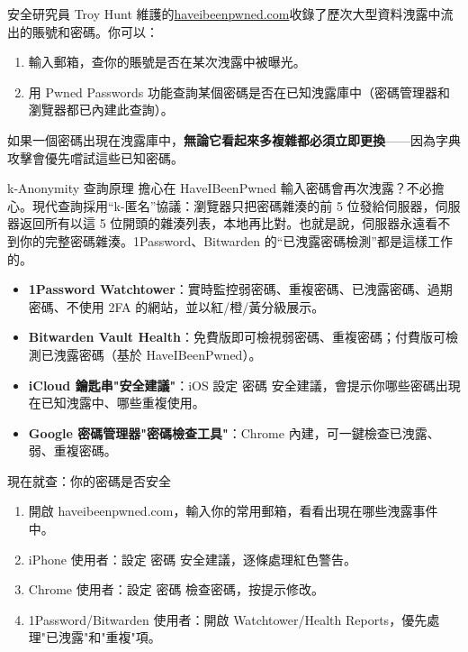安全研究員 Troy Hunt 維護的\href{https://haveibeenpwned.com}{haveibeenpwned.com}收錄了歷次大型資料洩露中流出的賬號和密碼。你可以：

\begin{enumerate}
  \item 輸入郵箱，查你的賬號是否在某次洩露中被曝光。
  \item 用 Pwned Passwords 功能查詢某個密碼是否在已知洩露庫中（密碼管理器和瀏覽器都已內建此查詢）。
\end{enumerate}

如果一個密碼出現在洩露庫中，\textbf{無論它看起來多複雜都必須立即更換}——因為字典攻擊會優先嚐試這些已知密碼。

\begin{tcbinfo}{k-Anonymity 查詢原理}
擔心在 HaveIBeenPwned 輸入密碼會再次洩露？不必擔心。現代查詢採用“k-匿名”協議：瀏覽器只把密碼雜湊的前 5 位發給伺服器，伺服器返回所有以這 5 位開頭的雜湊列表，本地再比對。也就是說，伺服器永遠看不到你的完整密碼雜湊。1Password、Bitwarden 的“已洩露密碼檢測”都是這樣工作的。

\end{tcbinfo}


\begin{itemize}
  \item \textbf{1Password Watchtower}：實時監控弱密碼、重複密碼、已洩露密碼、過期密碼、不使用 2FA 的網站，並以紅/橙/黃分級展示。
  \item \textbf{Bitwarden Vault Health}：免費版即可檢視弱密碼、重複密碼；付費版可檢測已洩露密碼（基於 HaveIBeenPwned）。
  \item \textbf{iCloud 鑰匙串"安全建議"}：iOS 設定 密碼 安全建議，會提示你哪些密碼出現在已知洩露中、哪些重複使用。
  \item \textbf{Google 密碼管理器"密碼檢查工具"}：Chrome 內建，可一鍵檢查已洩露、弱、重複密碼。
\end{itemize}

\begin{tcbpractice}{現在就查：你的密碼是否安全}
\begin{enumerate}
  \item 開啟 haveibeenpwned.com，輸入你的常用郵箱，看看出現在哪些洩露事件中。
  \item iPhone 使用者：設定 密碼 安全建議，逐條處理紅色警告。
  \item Chrome 使用者：設定 密碼 檢查密碼，按提示修改。
  \item 1Password/Bitwarden 使用者：開啟 Watchtower/Health Reports，優先處理"已洩露"和"重複"項。
\end{enumerate}

\end{tcbpractice}

